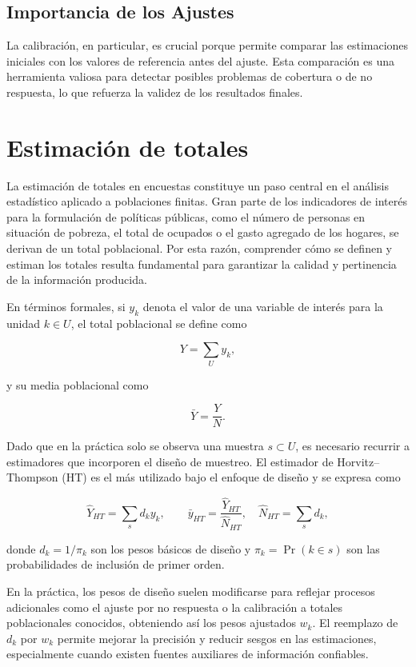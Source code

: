 \documentclass[
  12pt,
]{book}
\begin{document}
\subsection{Importancia de los Ajustes}\label{importancia-de-los-ajustes}

La calibración, en particular, es crucial porque permite comparar las estimaciones iniciales con los valores de referencia antes del ajuste. Esta comparación es una herramienta valiosa para detectar posibles problemas de cobertura o de no respuesta, lo que refuerza la validez de los resultados finales.

\section{Estimación de totales}\label{estimaciuxf3n-de-totales}

La estimación de totales en encuestas constituye un paso central en el análisis estadístico aplicado a poblaciones finitas. Gran parte de los indicadores de interés para la formulación de políticas públicas, como el número de personas en situación de pobreza, el total de ocupados o el gasto agregado de los hogares, se derivan de un total poblacional. Por esta razón, comprender cómo se definen y estiman los totales resulta fundamental para garantizar la calidad y pertinencia de la información producida.

En términos formales, si \(y_k\) denota el valor de una variable de interés para la unidad \(k \in U\), el total poblacional se define como

\[
Y = \sum_{U} y_k,
\]

y su media poblacional como

\[
\bar{Y} = \frac{Y}{N}.
\]

Dado que en la práctica solo se observa una muestra \(s \subset U\), es necesario recurrir a estimadores que incorporen el diseño de muestreo. El estimador de Horvitz--Thompson (HT) es el más utilizado bajo el enfoque de diseño y se expresa como

\[
\hat{Y}_{HT} = \sum_{s} d_k y_k, \qquad \bar{y}_{HT} = \frac{\hat{Y}_{HT}}{\hat{N}_{HT}}, \quad \hat{N}_{HT} = \sum_{s} d_k,
\]

donde \(d_k = 1/\pi_k\) son los pesos básicos de diseño y \(\pi_k = \Pr(k \in s)\) son las probabilidades de inclusión de primer orden.

En la práctica, los pesos de diseño suelen modificarse para reflejar procesos adicionales como el ajuste por no respuesta o la calibración a totales poblacionales conocidos, obteniendo así los pesos ajustados \(w_k\). El reemplazo de \(d_k\) por \(w_k\) permite mejorar la precisión y reducir sesgos en las estimaciones, especialmente cuando existen fuentes auxiliares de información confiables.
\end{document}
